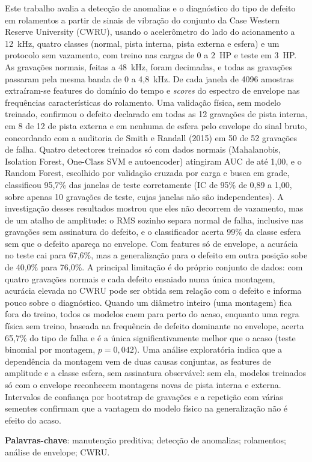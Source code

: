 \documentclass[
  12pt,
  oneside,          %
  a4paper,
  chapter=TITLE,   %
  english,
  brazil
]{abntex2}
\renewcommand{\imprimircapa}{%
  \begin{capa}%
    \centering
    {\normalfont\large\imprimirinstituicao}\par
    \vspace*{2cm}
    {\normalfont\large\imprimirautor}
    \vfill
    {\normalfont\bfseries\large\imprimirtitulo}
    \vfill
    {\normalfont\large\imprimirlocal}\par
    {\normalfont\large\imprimirdata}
  \end{capa}%
}
\begin{document}
\frenchspacing

\pretextual

\imprimircapa
\imprimirfolhaderosto

\begin{resumo}
  Este trabalho avalia a detecção de anomalias e o diagnóstico do tipo de
  defeito em rolamentos a partir de sinais de vibração do conjunto da Case
  Western Reserve University (CWRU), usando o acelerômetro do lado do
  acionamento a 12~kHz, quatro classes (normal, pista interna, pista externa e
  esfera) e um protocolo sem vazamento, com treino nas cargas de 0 a 2~HP e teste
  em 3~HP. As gravações normais, feitas a 48~kHz, foram decimadas, e todas as
  gravações passaram pela mesma banda de 0 a 4,8~kHz. De cada janela de 4096
  amostras extraíram-se features do domínio do tempo e \emph{scores} do espectro de
  envelope nas frequências características do rolamento. Uma validação física,
  sem modelo treinado, confirmou o defeito declarado em todas as 12 gravações de
  pista interna, em 8 de 12 de pista externa e em nenhuma de esfera pelo envelope
  do sinal bruto, concordando
  com a auditoria de Smith e Randall (2015) em 50 de 52 gravações de falha. Quatro
  detectores treinados só com dados normais (Mahalanobis, Isolation Forest,
  One-Class SVM e autoencoder) atingiram AUC de até 1,00, e o Random Forest, escolhido por
  validação cruzada por carga e busca em grade, classificou 95,7\% das janelas
  de teste corretamente (IC de 95\% de 0,89 a 1,00, sobre apenas 10 gravações
  de teste, cujas janelas não são independentes). A investigação desses
  resultados mostrou que eles não decorrem de vazamento, mas de um atalho de
  amplitude: o RMS sozinho separa normal de falha, inclusive nas gravações sem
  assinatura do defeito, e o classificador acerta 99\% da classe esfera sem que
  o defeito apareça no envelope. Com features só de envelope, a acurácia no teste
  cai para 67,6\%, mas a generalização para o defeito em outra posição sobe de
  40,0\% para 76,0\%. A principal limitação é do próprio conjunto de dados: com
  quatro gravações normais e cada defeito ensaiado numa única montagem, acurácia
  elevada no CWRU pode ser obtida sem relação com o defeito e informa pouco sobre
  o diagnóstico. Quando um
  diâmetro inteiro (uma montagem) fica fora do treino, todos os modelos caem para
  perto do acaso, enquanto uma regra física sem treino, baseada na frequência de
  defeito dominante no envelope, acerta 65,7\% do tipo de falha e é a única
  significativamente melhor que o acaso (teste binomial por montagem, $p = 0{,}042$).
  Uma análise exploratória indica que a dependência da montagem vem de duas
  causas conjuntas, as features de amplitude e a classe esfera, sem assinatura
  observável: sem ela, modelos treinados só com o envelope reconhecem montagens
  novas de pista interna e externa.
  Intervalos de confiança por bootstrap de gravações e a repetição com várias
  sementes confirmam que a vantagem do modelo físico na generalização não é
  efeito do acaso.

  \textbf{Palavras-chave}: manutenção preditiva; detecção de anomalias;
  rolamentos; análise de envelope; CWRU.
\end{resumo}
\end{document}
